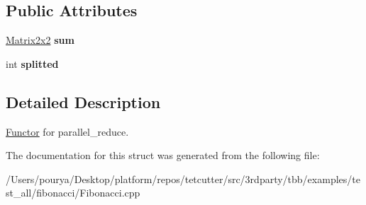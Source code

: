 \subsection*{Public Attributes}
\begin{DoxyCompactItemize}
\item 
\hypertarget{structparallel__reduceFibBody_aa1304d5caba672071017fa3e2a7cf102}{}\hyperlink{structMatrix2x2}{Matrix2x2} {\bfseries sum}\label{structparallel__reduceFibBody_aa1304d5caba672071017fa3e2a7cf102}

\item 
\hypertarget{structparallel__reduceFibBody_a5e2ef96b9d4f524941bc4604978d673d}{}int {\bfseries splitted}\label{structparallel__reduceFibBody_a5e2ef96b9d4f524941bc4604978d673d}

\end{DoxyCompactItemize}


\subsection{Detailed Description}
\hyperlink{structFunctor}{Functor} for parallel\+\_\+reduce. 

The documentation for this struct was generated from the following file\+:\begin{DoxyCompactItemize}
\item 
/\+Users/pourya/\+Desktop/platform/repos/tetcutter/src/3rdparty/tbb/examples/test\+\_\+all/fibonacci/Fibonacci.\+cpp\end{DoxyCompactItemize}
